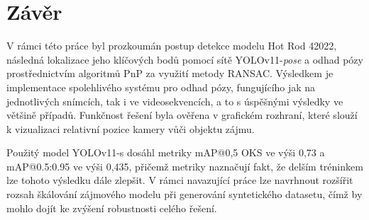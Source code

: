 \chapter{Závěr}
\label{sec:Chapter6}
V rámci této práce byl prozkoumán postup detekce modelu Hot Rod 42022, následná lokalizace jeho klíčových bodů pomocí sítě YOLOv11-\textit{pose} a odhad pózy prostřednictvím algoritmů PnP za využití metody RANSAC. Výsledkem je implementace spolehlivého systému pro odhad pózy, fungujícího jak na jednotlivých snímcích, tak i ve videosekvencích, a to s úspěšnými výsledky ve většině případů. Funkčnost řešení byla ověřena v grafickém rozhraní, které slouží k vizualizaci relativní pozice kamery vůči objektu zájmu.

Použitý model YOLOv11-s dosáhl metriky mAP@0,5 OKS ve výši 0,73 a mAP@0.5:0.95 ve výši 0,435, přičemž metriky naznačují fakt, že delším tréninkem lze tohoto výsledku dále zlepšit. V rámci navazující práce lze navrhnout rozšířit rozsah škálování zájmového modelu při generování syntetického datasetu, čímž by mohlo dojít ke zvýšení robustnosti celého řešení.
